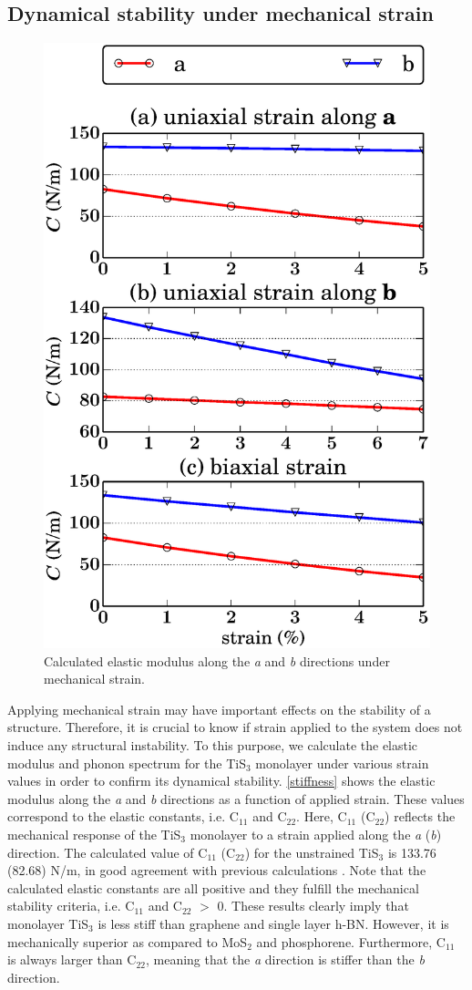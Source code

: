 \subsection{Dynamical stability under  mechanical strain}

\begin{figure}[htb]
\centering
\includegraphics[width=0.6\linewidth]{Mob_stiffness.eps}
\caption{Calculated elastic modulus along the \textit{a} and \textit{b} directions under mechanical strain. \label{stiffness}}	
\end{figure}

Applying mechanical strain may have important effects on the stability of a structure. Therefore, it is crucial to know if  strain applied to the system does not induce any structural instability. To this purpose, we calculate the elastic modulus and phonon spectrum for the TiS$_3$ monolayer under various strain values in order to confirm its dynamical stability.  \autoref{stiffness} shows the elastic modulus along the \textit{a}  and \textit{b}  directions as a function of applied strain. These values correspond to the elastic constants, i.e.  C$_{11}$ and C$_{22}$.  Here, C$_{11}$ (C$_{22}$) reflects the mechanical response of the TiS$_3$ monolayer to a strain applied along the \textit{a} (\textit{b}) direction.  The calculated value of C$_{11}$ (C$_{22}$) for the unstrained TiS$_3$ is 133.76 (82.68) N/m, in good agreement with previous calculations \cite{Dai2015,kang2015m}. Note that the calculated elastic constants are all positive and they fulfill the mechanical stability criteria, i.e. C$_{11}$ and C$_{22}$ $>$ 0. These results clearly imply that monolayer TiS$_3$ is less stiff than graphene and single layer h-BN. However, it is mechanically superior as compared to MoS$_2$ and phosphorene\cite{QHA2}. Furthermore, C$_{11}$ is always larger than C$_{22}$, meaning that the \textit{a} direction is stiffer than the \textit{b} direction. 

